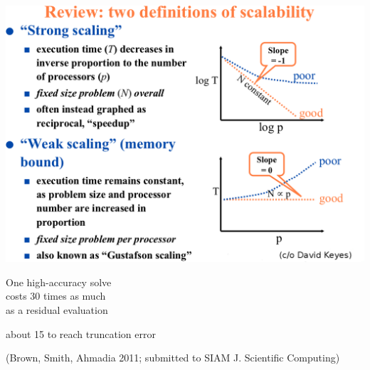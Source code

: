 \documentclass{beamer}
\begin{document}
\begin{frame}
  \includegraphics[width=\textwidth]{figures/KeyesStrongWeak} \\
\end{frame}

\begin{frame}
  \begin{center}
    \alert{\huge One high-accuracy solve \\[0.2em]
      costs 30 times as much \\[0.5em]
      as a residual evaluation}
  \end{center}
  \begin{center}
    about 15 to reach truncation error

    \bigskip

    
    \bigskip

    {(Brown, Smith, Ahmadia 2011; submitted to SIAM J. Scientific Computing)}
  \end{center}
\end{frame}
\end{document}
